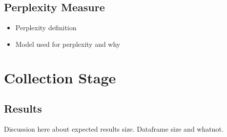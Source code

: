 \documentclass{l4proj}
\theoremstyle{definition}
\begin{document}
    \subsection{Perplexity Measure}
        \begin{itemize}
            \item Perplexity definition
            \item Model used for perplexity and why
        \end{itemize}

\section{Collection Stage}
    \subsection{Results}
        Discussion here about expected results size. Dataframe size and whatnot.







\end{document}
